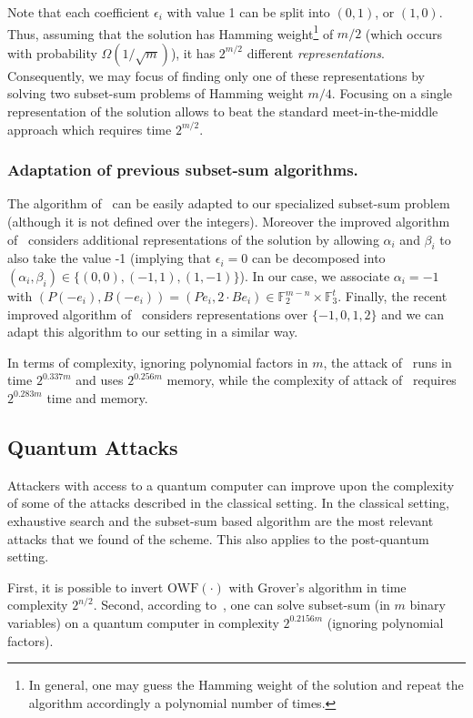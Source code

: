 \documentclass[orivec,envcountsect]{llncs}
\newcommand{\OWF}{\text{OWF}}
\begin{document}
Note that each coefficient $\epsilon_i$ with value 1 can be split into $(0,1)$, or $(1,0)$.
Thus, assuming that the solution has Hamming weight\footnote{In general, one
may guess the Hamming weight of the solution and
repeat the algorithm accordingly a polynomial number of times.} of $m/2$
(which occurs with probability $\Omega(1/\sqrt{m})$),
it has $2^{m/2}$ different \emph{representations}.
Consequently, we may focus of finding only one of these representations
by solving two subset-sum problems of Hamming weight $m/4$.
Focusing on a single representation of the solution
allows to beat the standard meet-in-the-middle approach which requires time $2^{m/2}$.

\subsubsection{Adaptation of previous subset-sum algorithms.}
The algorithm of~\cite{Howgrave-GrahamJ10} can be easily adapted
to our specialized subset-sum problem (although it is not defined over the integers).
Moreover the improved algorithm of~\cite{BeckerCJ11} considers additional representations
of the solution by allowing $\alpha_i$ and $\beta_i$ to also take the value -1
(implying that $\epsilon_i = 0$ can be decomposed into
$(\alpha_i,\beta_i) \in \{(0,0),(-1,1),(1,-1)\}$).
In our case, we associate $\alpha_i = -1$
with $(P(-e_i), B(-e_i)) = (Pe_i, 2 \cdot Be_i)  \in \mathbb{F}_2^{m-n} \times \mathbb{F}_3^t$.
Finally, the recent improved algorithm of~\cite{BonnetainBSS20} considers representations over
$\{-1,0,1,2\}$ and we can adapt this algorithm to our setting in a similar way.

In terms of complexity, ignoring polynomial factors in $m$,
the attack of~\cite{Howgrave-GrahamJ10} runs in time $2^{0.337m}$ and uses $2^{0.256m}$ memory,
while the complexity of attack of~\cite{BonnetainBSS20} requires $2^{0.283m}$ time and memory.


\subsection{Quantum Attacks}

Attackers with access to a quantum computer can improve upon the complexity of some of the attacks described in the classical setting. In the classical setting, exhaustive search and the subset-sum based algorithm are the most relevant attacks that we found of the scheme. This also applies to the post-quantum setting.

First, it is possible to invert $\OWF(\cdot)$ with Grover's algorithm in time complexity $2^{n/2}$. Second, according to~\cite{BonnetainBSS20}, one can solve subset-sum (in $m$ binary variables) on a quantum computer in complexity $2^{0.2156 m}$ (ignoring polynomial factors).
\end{document}
